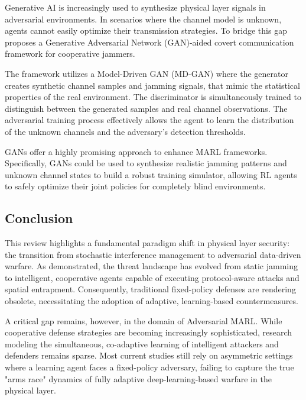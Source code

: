 \documentclass[conference]{IEEEtran}
\newcommand{\adm}[1]{{\color{orange}{[#1]}}}
\newcommand{\rar}[1]{{\color{blue}{[#1]}}}
\begin{document}
Generative AI is increasingly used to synthesize physical layer signals in adversarial environments. \adm{cite} 
In scenarios where the channel model is unknown, agents cannot easily optimize their transmission strategies. 
To bridge this gap~\cite{wen2025generative} proposes a Generative Adversarial Network (GAN)-aided covert communication framework for cooperative jammers.

The framework utilizes a Model-Driven GAN (MD-GAN) where the generator creates synthetic channel samples and jamming signals, that mimic the statistical properties of the real environment. 
The discriminator is simultaneously trained to distinguish between the generated samples and real channel observations. 
The adversarial training process effectively allows the agent to learn the distribution of the unknown channels and the adversary's detection thresholds.

GANs offer a highly promising approach to enhance MARL frameworks.
Specifically, GANs could be used to synthesize realistic jamming patterns and unknown channel states to build a robust training simulator, allowing RL agents to safely optimize their joint policies for completely blind environments.


\subsection{Conclusion} \rar{a whole section is not really needed for related works rather a final paragraph.}
This review highlights a fundamental paradigm shift in physical layer security: the transition from stochastic interference management to adversarial data-driven warfare. 
As demonstrated, the threat landscape has evolved from static jamming to intelligent, cooperative agents capable of executing protocol-aware attacks and spatial entrapment. 
Consequently, traditional fixed-policy defenses are rendering obsolete, necessitating the adoption of adaptive, learning-based countermeasures.

A critical gap remains, however, in the domain of Adversarial MARL. 
While cooperative defense strategies are becoming increasingly sophisticated, research modeling the simultaneous, co-adaptive learning of intelligent attackers and defenders remains sparse. Most current studies still rely on asymmetric settings where a learning agent faces a fixed-policy adversary, failing to capture the true "arms race" dynamics of fully adaptive deep-learning-based warfare in the physical layer.
\end{document}
